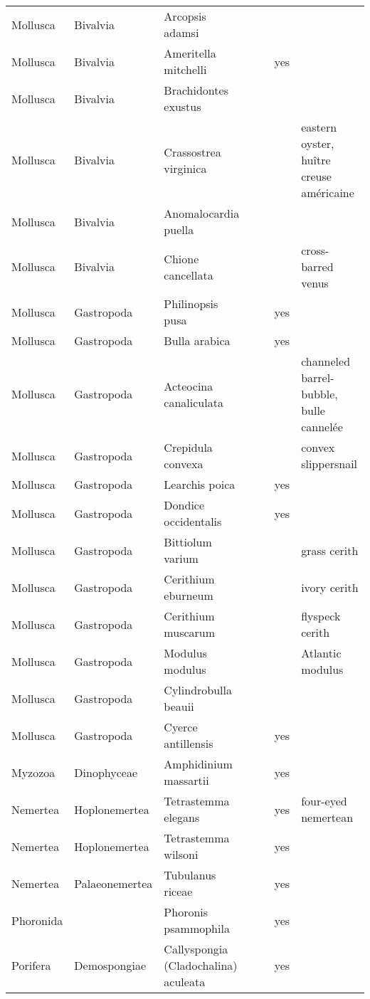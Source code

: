 \begin{longtable}{lllllll}
  Mollusca & Bivalvia & Arcopsis adamsi &  &  &  &  \\ 
  Mollusca & Bivalvia & Ameritella mitchelli &  &  & yes &  \\ 
  Mollusca & Bivalvia & Brachidontes exustus &  &  &  &  \\ 
  Mollusca & Bivalvia & Crassostrea virginica &  &  &  & eastern oyster, huître creuse américaine \\ 
  Mollusca & Bivalvia & Anomalocardia puella &  &  &  &  \\ 
  Mollusca & Bivalvia & Chione cancellata &  &  &  & cross-barred venus \\ 
  Mollusca & Gastropoda & Philinopsis pusa &  &  & yes &  \\ 
  Mollusca & Gastropoda & Bulla arabica &  &  & yes &  \\ 
  Mollusca & Gastropoda & Acteocina canaliculata &  &  &  & channeled barrel-bubble, bulle cannelée \\ 
  Mollusca & Gastropoda & Crepidula convexa &  &  &  & convex slippersnail \\ 
  Mollusca & Gastropoda & Learchis poica &  &  & yes &  \\ 
  Mollusca & Gastropoda & Dondice occidentalis &  &  & yes &  \\ 
  Mollusca & Gastropoda & Bittiolum varium &  &  &  & grass cerith \\ 
  Mollusca & Gastropoda & Cerithium eburneum &  &  &  & ivory cerith \\ 
  Mollusca & Gastropoda & Cerithium muscarum &  &  &  & flyspeck cerith \\ 
  Mollusca & Gastropoda & Modulus modulus &  &  &  & Atlantic modulus \\ 
  Mollusca & Gastropoda & Cylindrobulla beauii &  &  &  &  \\ 
  Mollusca & Gastropoda & Cyerce antillensis &  &  & yes &  \\ 
  Myzozoa & Dinophyceae & Amphidinium massartii &  &  & yes &  \\ 
  Nemertea & Hoplonemertea & Tetrastemma elegans &  &  & yes & four-eyed nemertean \\ 
  Nemertea & Hoplonemertea & Tetrastemma wilsoni &  &  & yes &  \\ 
  Nemertea & Palaeonemertea & Tubulanus riceae &  &  & yes &  \\ 
  Phoronida &  & Phoronis psammophila &  &  & yes &  \\ 
  Porifera & Demospongiae & Callyspongia (Cladochalina) aculeata &  &  & yes &  \\ 

\end{longtable}
